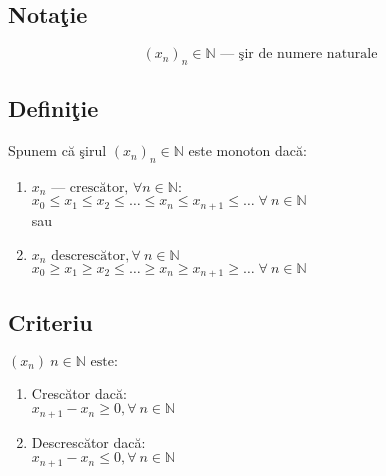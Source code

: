 \documentclass[a4paper, 12pt, notitlepage]{book}
\begin{document}
    \subsection{Nota\c{t}ie}
    \[ (x_{n})_{n} \in \mathbb{N} \text{ --- \c{s}ir de numere naturale} \]

    \subsection{Defini\c{t}ie}
    Spunem c\u{a} \c{s}irul ${(x_{n})}_{n} \in \mathbb{N}$ este monoton dac\u{a}:
    \begin{enumerate}
      \item $x_n \text{ --- cresc\u{a}tor, } \forall n \in \mathbb{N}:$\\[5pt]
            $x_{0} \le x_{1} \le x_{2} \le \ldots \le x_{n} \le x_{n+1} \le \ldots \; \forall\ n \in \mathbb{N}$\\

            sau\\
      \item $x_{n} \text{ descresc\u{a}tor}, \forall\ n \in \mathbb{N}$\\[5pt]
            $x_{0} \ge x_{1} \ge x_{2} \le \ldots \ge x_{n} \ge x_{n+1} \ge \ldots \; \forall\ n \in \mathbb{N}$\\
    \end{enumerate}

    \subsection{Criteriu}
    $(x_{n})\ n \in \mathbb{N} \text{ este:}$
    \begin{enumerate}[\quad a.]
      \item Cresc\u{a}tor dac\u{a}:\\[5pt]
            $x_{n+1} - x_{n} \ge 0, \forall\ n \in \mathbb{N}$
      \item Descresc\u{a}tor dac\u{a}:\\[5pt]
            $x_{n+1} - x_{n} \le 0, \forall\ n \in \mathbb{N}$
    \end{enumerate}
\end{document}
